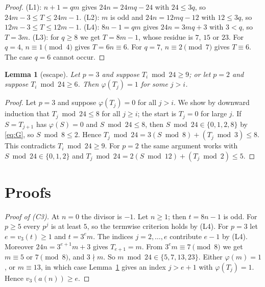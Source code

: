 \documentclass[11pt]{amsart}
\newtheorem{lemma}[theorem]{Lemma}
\theoremstyle{remark}
\begin{document}
\begin{proof}
(L1): $n+1=qm$ gives $24n=24mq-24$ with $24\le3q$, so $24m-3\le T\le24m-1$.
(L2): $m$ is odd and $24n=12mq-12$ with $12\le3q$, so $12m-3\le T\le12m-1$.
(L4): $8n-1=qm$ gives $24n=3mq+3$ with $3<q$, so $T=3m$.
(L3): for $q\ge8$ we get $T=8m-1$, whose residue is $7$, $15$ or $23$. For $q=4$, $n\equiv1\pmod4$ gives $T=6n\equiv6$. For $q=7$, $n\equiv2\pmod7$ gives $T\equiv6$. The case $q=6$ cannot occur.
\end{proof}

\begin{lemma}[escape]\label{lem:escape}
Let $p=3$ and suppose $T_i\bmod24\ge9$; or let $p=2$ and suppose $T_i\bmod24\ge6$.
Then $\varphi(T_j)=1$ for some $j>i$.
\end{lemma}

\begin{proof}
Let $p=3$ and suppose $\varphi(T_j)=0$ for all $j>i$.
We show by downward induction that $T_j\bmod24\le8$ for all $j\ge i$; the start is $T_j=0$ for large $j$.
If $S=T_{j+1}$ has $\varphi(S)=0$ and $S\bmod24\le8$, then $S\bmod24\in\{0,1,2,8\}$ by \eqref{eq:G}, so $S\bmod8\le2$.
Hence $T_j\bmod 24=3(S\bmod8)+(T_j\bmod3)\le8$.
This contradicts $T_i\bmod24\ge9$.
For $p=2$ the same argument works with $S\bmod24\in\{0,1,2\}$ and $T_j\bmod24=2(S\bmod12)+(T_j\bmod2)\le5$.
\end{proof}

\section{Proofs}

\begin{proof}[Proof of (C3)]
At $n=0$ the divisor is $-1$.
Let $n\ge1$; then $t=8n-1$ is odd.
For $p\ge5$ every $p^j$ is at least $5$, so the termwise criterion holds by (L4).
For $p=3$ let $e=v_3(t)\ge1$ and $t=3^em$.
The indices $j=2,\dots,e$ contribute $e-1$ by (L4).
Moreover $24n=3^{e+1}m+3$ gives $T_{e+1}=m$.
From $3^em\equiv7\pmod8$ we get $m\equiv5$ or $7\pmod8$, and $3\nmid m$.
So $m\bmod24\in\{5,7,13,23\}$.
Either $\varphi(m)=1$, or $m\equiv13$, in which case Lemma~\ref{lem:escape} gives an index $j>e+1$ with $\varphi(T_j)=1$.
Hence $v_3(a(n))\ge e$.
\end{proof}
\end{document}
